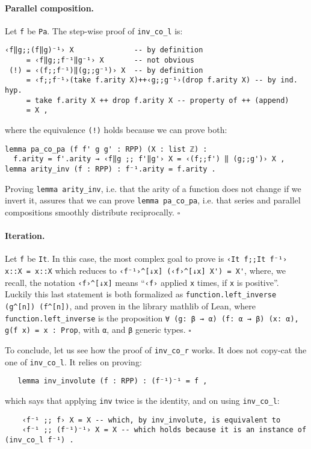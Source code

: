 \documentclass[runningheads]{llncs}
\newcommand*{\qedb}{\hfill\ensuremath{\square}}%
\newcommand{\MATHLIB}{\textsf{mathlib}\xspace}
\newcommand{\LEAN}{\textsf{Lean}\xspace}
\begin{document}
\paragraph{Parallel composition.} Let \lstinline|f| be \lstinline|Pa|. The step-wise proof of \lstinline|inv_co_l| is:
\begin{lstlisting}
‹f‖g;;(f‖g)⁻¹› X              -- by definition
     = ‹f‖g;;f⁻¹‖g⁻¹› X       -- not obvious
 (!) = ‹(f;;f⁻¹)‖(g;;g⁻¹)› X  -- by definition
     = ‹f;;f⁻¹›(take f.arity X)++‹g;;g⁻¹›(drop f.arity X) -- by ind. hyp.
     = take f.arity X ++ drop f.arity X -- property of ++ (append)
     = X ,
\end{lstlisting}
where the equivalence \lstinline|(!)| holds because we can prove both:
\begin{lstlisting}
lemma pa_co_pa (f f' g g' : RPP) (X : list ℤ) :
  f.arity = f'.arity → ‹f‖g ;; f'‖g'› X = ‹(f;;f') ‖ (g;;g')› X ,
lemma arity_inv (f : RPP) : f⁻¹.arity = f.arity .
\end{lstlisting}
Proving \lstinline|lemma arity_inv|, i.e. that the arity of a function does not change if we invert it, assures that we can prove \lstinline|lemma pa_co_pa|, i.e. that series and parallel compositions smoothly distribute reciprocally.
\qedb

\paragraph{Iteration.} Let \lstinline|f| be \lstinline|It|.
In this case, the most complex goal to prove is \lstinline|‹It f;;It f⁻¹› x::X = x::X| which reduces to \lstinline|‹f⁻¹›^[↓x] (‹f›^[↓x] X') = X'|, where, we recall, the notation \lstinline|‹f›^[↓x]| means ``\lstinline|‹f›| applied \lstinline|x| times, if \lstinline|x| is positive''. Luckily this last statement is both formalized as \lstinline|function.left_inverse (g^[n]) (f^[n])|, and proven in the library \MATHLIB of \LEAN, where \lstinline|function.left_inverse| is the proposition \lstinline|∀ (g: β → α) (f: α → β) (x: α), g(f x) = x : Prop|, with \lstinline|α|, and \lstinline|β| generic types.
\qedb

\vspace{\baselineskip}
To conclude, let us see how the proof of \lstinline|inv_co_r| works. It does not copy-cat the one of \lstinline|inv_co_l|. It relies on proving:
\begin{lstlisting}
   lemma inv_involute (f : RPP) : (f⁻¹)⁻¹ = f ,
\end{lstlisting}
\noindent
which says that applying \lstinline|inv| twice is the identity, and on using \lstinline|inv_co_l|:
\begin{lstlisting}
    ‹f⁻¹ ;; f› X = X -- which, by inv_involute, is equivalent to
    ‹f⁻¹ ;; (f⁻¹)⁻¹› X = X -- which holds because it is an instance of (inv_co_l f⁻¹) .
\end{lstlisting}
\end{document}
